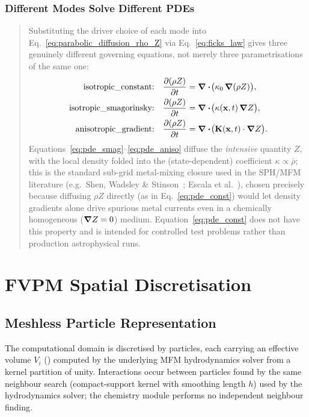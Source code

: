 \documentclass[11pt, a4paper, parskip]{scrartcl}
\newcommand{\code}[1]{\texttt{\seqsplit{#1}}}
\theoremstyle{plain}
\theoremstyle{definition}
\newcommand{\Zfrac}{Z}                                  %
\newcommand{\rhoZ}{\rho \Zfrac}                          %
\newcommand{\Kmat}{\mathbf{K}}                            %
\newcommand{\kappaC}{\kappa_{0}}                          %
\newcommand{\kappaP}{\kappa}                              %
\begin{document}
\subsubsection{Different Modes Solve Different PDEs}
\label{sec:pde-per-mode}
\begin{quote}
Substituting the driver choice of each mode into
Eq.~\eqref{eq:parabolic_diffusion_rho_Z} via Eq.~\eqref{eq:ficks_law}
gives three genuinely different governing equations, not merely three
parametrisations of the same one:
\begin{align}
  \text{isotropic\_constant:} &\quad
    \pdv{(\rhoZ)}{t} = \div\!\big(\kappaC\, \grad(\rhoZ)\big) ,
    \label{eq:pde_const}\\
  \text{isotropic\_smagorinsky:} &\quad
    \pdv{(\rhoZ)}{t} = \div\!\big(\kappaP(\mathbf x,t)\, \grad \Zfrac\big) ,
    \label{eq:pde_smag}\\
  \text{anisotropic\_gradient:} &\quad
    \pdv{(\rhoZ)}{t} = \div\!\big(\Kmat(\mathbf x,t) \cdot \grad \Zfrac\big) .
    \label{eq:pde_aniso}
\end{align}
Equations~\eqref{eq:pde_smag}--\eqref{eq:pde_aniso} diffuse the
\emph{intensive} quantity $\Zfrac$, with the local density folded into
the (state-dependent) coefficient $\kappaP \propto \bar\rho$; this is the
standard sub-grid metal-mixing closure used in the SPH/MFM literature
(e.g.\ Shen, Wadsley \& Stinson~\citeyear{ShenWadsleyStinson2010}; Escala et al.~\citeyear{Escala2018}), chosen
precisely because diffusing $\rhoZ$ directly (as in
Eq.~\eqref{eq:pde_const}) would let density gradients alone drive
spurious metal currents even in a chemically homogeneous ($\grad Z = 0$)
medium. Equation~\eqref{eq:pde_const} does not have this property and is
intended for controlled test problems rather than production
astrophysical runs.
\end{quote}

\section{FVPM Spatial Discretisation}
\label{sec:fvpm-geometry}

\subsection{Meshless Particle Representation}
The computational domain is discretised by particles, each carrying an
effective volume $V_i$ (\code{p->geometry.volume}) computed by the
underlying MFM hydrodynamics solver from a kernel partition of unity.
Interactions occur between particles found by the same neighbour search
(compact-support kernel with smoothing length $h$) used by the
hydrodynamics solver; the chemistry module performs no independent
neighbour finding.
\end{document}
